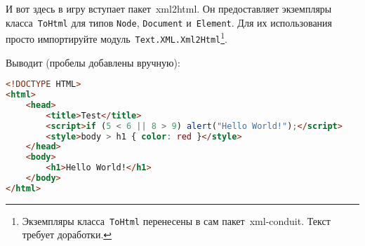 И вот здесь в игру вступает пакет~xml2html. Он предоставляет
экземпляры класса~\lstinline!ToHtml! для типов \lstinline!Node!,
\lstinline!Document! и~\lstinline!Element!. Для их использования просто
импортируйте модуль~\lstinline!Text.XML.Xml2Html!\footnote{Экземпляры
класса~\lstinline!ToHtml! перенесены в сам пакет~xml-conduit.
Текст требует доработки.}.


Выводит (пробелы добавлены вручную):

\begin{lstlisting}[language=HTML]
<!DOCTYPE HTML>
<html>
    <head>
        <title>Test</title>
        <script>if (5 < 6 || 8 > 9) alert("Hello World!");</script>
        <style>body > h1 { color: red }</style>
    </head>
    <body>
        <h1>Hello World!</h1>
    </body>
</html>
\end{lstlisting}%
